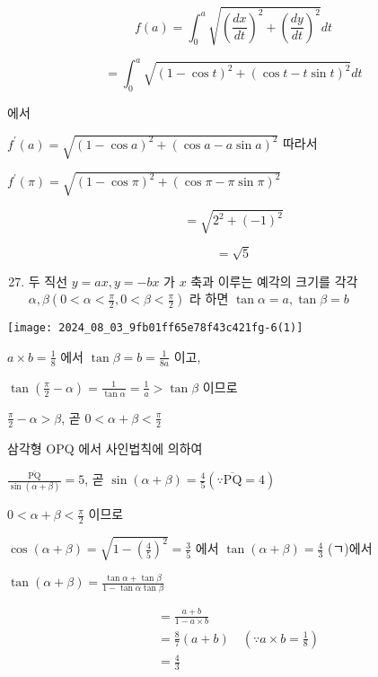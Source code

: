 \documentclass[10pt]{article}
\begin{document}
\[
f(a)=\int_{0}^{a} \sqrt{\left(\frac{d x}{d t}\right)^{2}+\left(\frac{d y}{d t}\right)^{2}} d t
\]

\[
=\int_{0}^{a} \sqrt{(1-\cos t)^{2}+(\cos t-t \sin t)^{2}} d t
\]

에서

\(f^{\prime}(a)=\sqrt{(1-\cos a)^{2}+(\cos a-a \sin a)^{2}}\) 따라서

\(f^{\prime}(\pi)=\sqrt{(1-\cos \pi)^{2}+(\cos \pi-\pi \sin \pi)^{2}}\)

\[
=\sqrt{2^{2}+(-1)^{2}}
\]

\[
=\sqrt{5}
\]

\begin{enumerate}
  \setcounter{enumi}{26}
  \item 두 직선 \(y=a x, y=-b x\) 가 \(x\) 축과 이루는 예각의 크기를 각각 \(\alpha, \beta\left(0<\alpha<\frac{\pi}{2}, 0<\beta<\frac{\pi}{2}\right)\) 라 하면 \(\tan \alpha=a, \tan \beta=b\)
\end{enumerate}

\begin{center}
\texttt{[image: 2024\_08\_03\_9fb01ff65e78f43c421fg-6(1)]}
\end{center}

\(a \times b=\frac{1}{8}\) 에서 \(\tan \beta=b=\frac{1}{8 a}\) 이고,

\(\tan \left(\frac{\pi}{2}-\alpha\right)=\frac{1}{\tan \alpha}=\frac{1}{a}>\tan \beta\) 이므로

\(\frac{\pi}{2}-\alpha>\beta\), 곧 \(0<\alpha+\beta<\frac{\pi}{2}\)

삼각형 OPQ 에서 사인법칙에 의하여

\(\frac{\overline{\mathrm{PQ}}}{\sin (\alpha+\beta)}=5\), 곧 \(\sin (\alpha+\beta)=\frac{4}{5}(\because \overline{\mathrm{PQ}}=4)\)

\(0<\alpha+\beta<\frac{\pi}{2}\) 이므로

\(\cos (\alpha+\beta)=\sqrt{1-\left(\frac{4}{5}\right)^{2}}=\frac{3}{5}\) 에서 \(\tan (\alpha+\beta)=\frac{4}{3}\) (ㄱ)에서

\(\tan (\alpha+\beta)=\frac{\tan \alpha+\tan \beta}{1-\tan \alpha \tan \beta}\)

\[
\begin{aligned}
& =\frac{a+b}{1-a \times b} \\
& =\frac{8}{7}(a+b) \quad\left(\because a \times b=\frac{1}{8}\right) \\
& =\frac{4}{3}
\end{aligned}
\]
\end{document}
